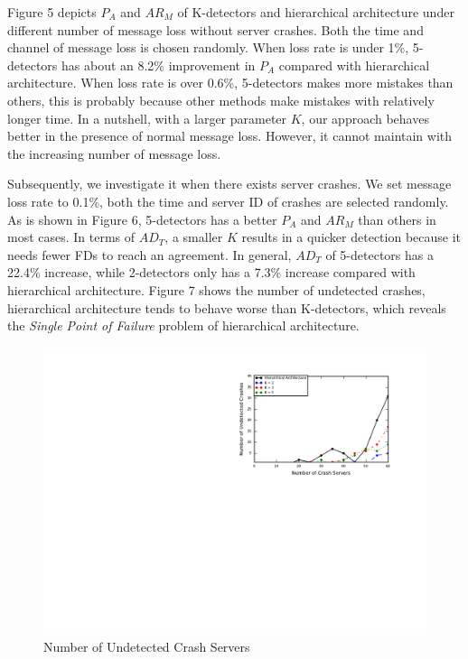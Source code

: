 \documentclass{sig-alternate-05-2015}
\begin{document}
Figure 5 depicts $P_A$ and $AR_M$ of K-detectors and hierarchical architecture under different number of message loss without server crashes. Both the time and channel of message loss is chosen randomly. When loss rate is under 1\%, 5-detectors has about an 8.2\% improvement in $P_A$ compared with hierarchical architecture. When loss rate is over 0.6\%, 5-detectors makes more mistakes than others, this is probably because other methods make mistakes with relatively longer time. In a nutshell, with a larger parameter $K$, our approach behaves better in the presence of normal message loss. However, it cannot maintain with the increasing number of message loss.

Subsequently, we investigate it when there exists server crashes. We set message loss rate to 0.1\%, both the time and server ID of crashes are selected randomly. As is shown in Figure 6, 5-detectors has a better $P_A$ and $AR_M$ than others in most cases. In terms of $AD_T$, a smaller $K$ results in a quicker detection because it needs fewer FDs to reach an agreement. In general, $AD_T$ of 5-detectors has a 22.4\% increase, while 2-detectors only has a 7.3\% increase compared with hierarchical architecture. Figure 7 shows the number of undetected crashes, hierarchical architecture tends to behave worse than K-detectors, which reveals the \textit{Single Point of Failure} problem of hierarchical architecture.

\begin{figure}[t]
  \centering
  \includegraphics[scale=0.7]{r6}
  \caption{Number of Undetected Crash Servers}
\end{figure}
\end{document}
